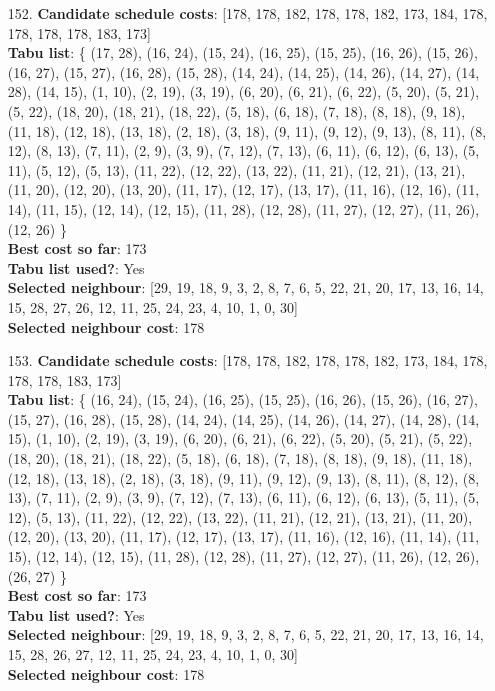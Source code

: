 \documentclass[fleqn]{article}
\begin{document}
\begin{itemize}
    \item[152.] \textbf{Candidate schedule costs}: [178, 178, 182, 178, 178, 182, 173, 184, 178, 178, 178, 178, 183, 173] \\
    \textbf{Tabu list}: \{ (17, 28), (16, 24), (15, 24), (16, 25), (15, 25), (16, 26), (15, 26), (16, 27), (15, 27), (16, 28), (15, 28), (14, 24), (14, 25), (14, 26), (14, 27), (14, 28), (14, 15), (1, 10), (2, 19), (3, 19), (6, 20), (6, 21), (6, 22), (5, 20), (5, 21), (5, 22), (18, 20), (18, 21), (18, 22), (5, 18), (6, 18), (7, 18), (8, 18), (9, 18), (11, 18), (12, 18), (13, 18), (2, 18), (3, 18), (9, 11), (9, 12), (9, 13), (8, 11), (8, 12), (8, 13), (7, 11), (2, 9), (3, 9), (7, 12), (7, 13), (6, 11), (6, 12), (6, 13), (5, 11), (5, 12), (5, 13), (11, 22), (12, 22), (13, 22), (11, 21), (12, 21), (13, 21), (11, 20), (12, 20), (13, 20), (11, 17), (12, 17), (13, 17), (11, 16), (12, 16), (11, 14), (11, 15), (12, 14), (12, 15), (11, 28), (12, 28), (11, 27), (12, 27), (11, 26), (12, 26) \} \\
    \textbf{Best cost so far}: 173 \\
    \textbf{Tabu list used?}: Yes \\
    \textbf{Selected neighbour}: [29, 19, 18, 9, 3, 2, 8, 7, 6, 5, 22, 21, 20, 17, 13, 16, 14, 15, 28, 27, 26, 12, 11, 25, 24, 23, 4, 10, 1, 0, 30] \\
    \textbf{Selected neighbour cost}: 178
      

    \item[153.] \textbf{Candidate schedule costs}: [178, 178, 182, 178, 178, 182, 173, 184, 178, 178, 178, 183, 173] \\
    \textbf{Tabu list}: \{ (16, 24), (15, 24), (16, 25), (15, 25), (16, 26), (15, 26), (16, 27), (15, 27), (16, 28), (15, 28), (14, 24), (14, 25), (14, 26), (14, 27), (14, 28), (14, 15), (1, 10), (2, 19), (3, 19), (6, 20), (6, 21), (6, 22), (5, 20), (5, 21), (5, 22), (18, 20), (18, 21), (18, 22), (5, 18), (6, 18), (7, 18), (8, 18), (9, 18), (11, 18), (12, 18), (13, 18), (2, 18), (3, 18), (9, 11), (9, 12), (9, 13), (8, 11), (8, 12), (8, 13), (7, 11), (2, 9), (3, 9), (7, 12), (7, 13), (6, 11), (6, 12), (6, 13), (5, 11), (5, 12), (5, 13), (11, 22), (12, 22), (13, 22), (11, 21), (12, 21), (13, 21), (11, 20), (12, 20), (13, 20), (11, 17), (12, 17), (13, 17), (11, 16), (12, 16), (11, 14), (11, 15), (12, 14), (12, 15), (11, 28), (12, 28), (11, 27), (12, 27), (11, 26), (12, 26), (26, 27) \} \\
    \textbf{Best cost so far}: 173 \\
    \textbf{Tabu list used?}: Yes \\
    \textbf{Selected neighbour}: [29, 19, 18, 9, 3, 2, 8, 7, 6, 5, 22, 21, 20, 17, 13, 16, 14, 15, 28, 26, 27, 12, 11, 25, 24, 23, 4, 10, 1, 0, 30] \\
    \textbf{Selected neighbour cost}: 178
      


\end{itemize}
\end{document}

